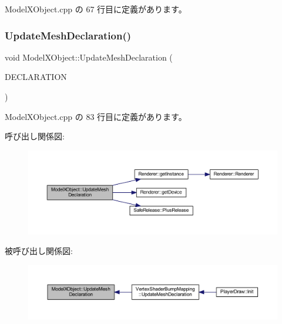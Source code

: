  Model\+X\+Object.\+cpp の 67 行目に定義があります。

\mbox{\label{class_model_x_object_ac005f3f164a1f75d6cfc0772e2e95382}} 
\subsubsection{\texorpdfstring{Update\+Mesh\+Declaration()}{UpdateMeshDeclaration()}}
{\footnotesize\ttfamily void Model\+X\+Object\+::\+Update\+Mesh\+Declaration (\begin{DoxyParamCaption}\item[{const D3\+D\+V\+E\+R\+T\+E\+X\+E\+L\+E\+M\+E\+N\+T9 $\ast$}]{D\+E\+C\+L\+A\+R\+A\+T\+I\+ON }\end{DoxyParamCaption})}



 Model\+X\+Object.\+cpp の 83 行目に定義があります。

呼び出し関係図\+:
\nopagebreak
\begin{figure}[H]
\begin{center}
\leavevmode
\includegraphics[width=350pt]{class_model_x_object_ac005f3f164a1f75d6cfc0772e2e95382_cgraph}
\end{center}
\end{figure}
被呼び出し関係図\+:\nopagebreak
\begin{figure}[H]
\begin{center}
\leavevmode
\includegraphics[width=350pt]{class_model_x_object_ac005f3f164a1f75d6cfc0772e2e95382_icgraph}
\end{center}
\end{figure}


